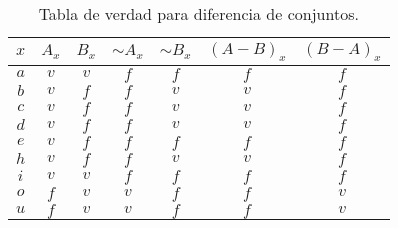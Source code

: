 \begin{table}[H]
\centering

\caption{Tabla de verdad para diferencia de conjuntos.}

\setlength\arrayrulewidth{1pt} 

\begin{tabular}{ccccc|c|c}
\arrayrulecolor{ptctitle}\hline\cellcolor{ptctitle!50}$x$ &
\cellcolor{ptctitle!50}$A_{x}$ &
\cellcolor{ptctitle!50}$B_{x}$ &
\cellcolor{ptctitle!50}$\sim A_{x}$ &
\cellcolor{ptctitle!50}$\sim B_{x}$ &
\cellcolor{ptctitle!50}$\left(A-B\right)_{x}$ &
\cellcolor{ptctitle!50}$\left(B-A\right)_{x}$\tabularnewline
\hline\cellcolor{ptcbackground}$a$ &
\cellcolor{ptcbackground} $v$ &
\cellcolor{ptcbackground} $v$ &
\cellcolor{ptcbackground} $f$ &
\cellcolor{ptcbackground} $f$ &
\cellcolor{ptcbackground}$f$ &
\cellcolor{ptcbackground}$f$\tabularnewline
\hline\cellcolor{gray!50}$b$ &
\cellcolor{gray!50} $v$ &
\cellcolor{gray!50} $f$ &
\cellcolor{gray!50} $f$ &
\cellcolor{gray!50} $v$ &
\cellcolor{gray!50}$v$ &
\cellcolor{gray!50}$f$\tabularnewline
\hline\cellcolor{ptcbackground}$c$ &
\cellcolor{ptcbackground} $v$ &
\cellcolor{ptcbackground} $f$ &
\cellcolor{ptcbackground} $f$ &
\cellcolor{ptcbackground} $v$ &
\cellcolor{ptcbackground} $v$ &
\cellcolor{ptcbackground} $f$\tabularnewline
\hline\cellcolor{gray!50}$d$ &
\cellcolor{gray!50} $v$ &
\cellcolor{gray!50} $f$ &
\cellcolor{gray!50} $f$ &
\cellcolor{gray!50} $v$ &
\cellcolor{gray!50} $v$ &
\cellcolor{gray!50} $f$\tabularnewline
\hline\cellcolor{ptcbackground}$e$ &
\cellcolor{ptcbackground} $v$ &
\cellcolor{ptcbackground} $f$ &
\cellcolor{ptcbackground} $f$ &
\cellcolor{ptcbackground} $f$ &
\cellcolor{ptcbackground} $f$ &
\cellcolor{ptcbackground} $f$\tabularnewline
\hline\cellcolor{gray!50}$h$ &
\cellcolor{gray!50} $v$ &
\cellcolor{gray!50} $f$ &
\cellcolor{gray!50} $f$ &
\cellcolor{gray!50} $v$ &
\cellcolor{gray!50} $v$ &
\cellcolor{gray!50} $f$\tabularnewline
\hline\cellcolor{ptcbackground}$i$ &
\cellcolor{ptcbackground} $v$ &
\cellcolor{ptcbackground} $v$ &
\cellcolor{ptcbackground} $f$ &
\cellcolor{ptcbackground} $f$ &
\cellcolor{ptcbackground} $f$ &
\cellcolor{ptcbackground} $f$\tabularnewline
\hline\cellcolor{gray!50}$o$ &
\cellcolor{gray!50} $f$ &
\cellcolor{gray!50} $v$ &
\cellcolor{gray!50} $v$ &
\cellcolor{gray!50} $f$ &
\cellcolor{gray!50} $f$ &
\cellcolor{gray!50} $v$\tabularnewline
\hline\cellcolor{ptcbackground}$u$ &
\cellcolor{ptcbackground} $f$ &
\cellcolor{ptcbackground} $v$ &
\cellcolor{ptcbackground} $v$ &
\cellcolor{ptcbackground} $f$ &
\cellcolor{ptcbackground} $f$ &
\cellcolor{ptcbackground} $v$\tabularnewline
\end{tabular}

\label{tdif}
\end{table}

